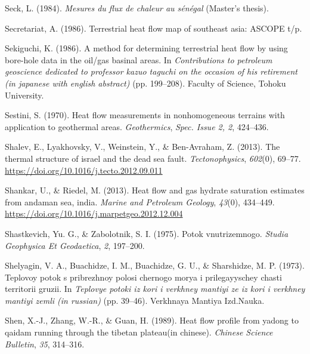 \begin{CSLReferences}{1}{1}
\leavevmode{}%
Seck, L. (1984). \emph{Mesures du flux de chaleur au sénégal} (Master's thesis).

\leavevmode{}%
Secretariat, A. (1986). Terrestrial heat flow map of southeast asia: ASCOPE t/p.

\leavevmode{}%
Sekiguchi, K. (1986). A method for determining terrestrial heat flow by using bore-hole data in the oil/gas basinal areas. In \emph{Contributions to petroleum geoscience dedicated to professor kazuo taguchi on the occasion of his retirement (in japanese with english abstract)} (pp. 199--208). Faculty of Science, Tohoku University.

\leavevmode{}%
Sestini, S. (1970). Heat flow measurements in nonhomogeneous terrains with application to geothermal areas. \emph{Geothermics}, \emph{Spec. Issue 2, 2}, 424--436.

\leavevmode{}%
Shalev, E., Lyakhovsky, V., Weinstein, Y., \& Ben-Avraham, Z. (2013). The thermal structure of israel and the dead sea fault. \emph{Tectonophysics}, \emph{602}(0), 69--77. \url{https://doi.org/10.1016/j.tecto.2012.09.011}

\leavevmode{}%
Shankar, U., \& Riedel, M. (2013). Heat flow and gas hydrate saturation estimates from andaman sea, india. \emph{Marine and Petroleum Geology}, \emph{43}(0), 434--449. \url{https://doi.org/10.1016/j.marpetgeo.2012.12.004}

\leavevmode{}%
Shastkevich, Yu. G., \& Zabolotnik, S. I. (1975). Potok vnutrizemnogo. \emph{Studia Geophysica Et Geodaetica}, \emph{2}, 197--200.

\leavevmode{}%
Shelyagin, V. A., Buachidze, I. M., Buachidze, G. U., \& Sharshidze, M. P. (1973). Teplovoy potok s pribrezhnoy polosi chernogo morya i prilegayyschey chasti territorii gruzii. In \emph{Teplovye potoki iz kori i verkhney mantiyi ze iz kori i verkhney mantiyi zemli (in russian)} (pp. 39--46). Verkhnaya Mantiya Izd.Nauka.

\leavevmode{}%
Shen, X.-J., Zhang, W.-R., \& Guan, H. (1989). Heat flow profile from yadong to qaidam running through the tibetan plateau(in chinese). \emph{Chinese Science Bulletin}, \emph{35}, 314--316.


\end{CSLReferences}

